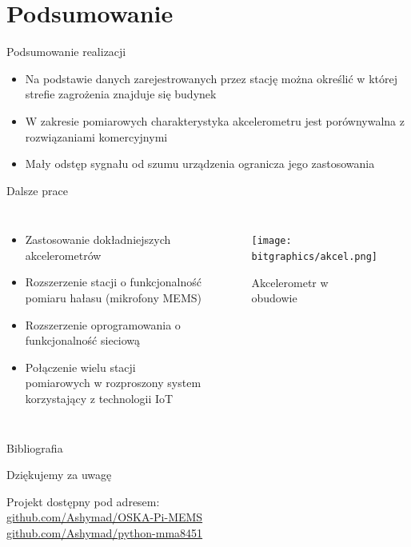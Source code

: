 \documentclass[aspectratio=1610,polish]{beamer} %
\begin{document}
  \section{Podsumowanie}
  \begin{frame}{Podsumowanie realizacji}
    \begin{itemize}
      \item Na podstawie danych zarejestrowanych przez stację można określić w której strefie zagrożenia znajduje się budynek
      \item W zakresie pomiarowych charakterystyka akcelerometru jest porównywalna z rozwiązaniami komercyjnymi
      \item Mały odstęp sygnału od szumu urządzenia ogranicza jego zastosowania
    \end{itemize}
  \end{frame}
  \begin{frame}{Dalsze prace}
    \begin{columns}
      \begin{itemize}
        \item Zastosowanie dokładniejszych akcelerometrów
        \item Rozszerzenie stacji o funkcjonalność pomiaru hałasu (mikrofony MEMS)
        \item Rozszerzenie oprogramowania o funkcjonalność sieciową
        \item Połączenie wielu stacji pomiarowych w rozproszony system korzystający z technologii IoT
      \end{itemize}
      \begin{figure}
        \texttt{[image: bitgraphics/akcel.png]}
        \caption{Akcelerometr w obudowie}
      \end{figure}
    \end{columns} 
  \end{frame}
  \begin{frame}{Bibliografia}
    \nocite{*}
    \printbibliography
  \end{frame}
  \begin{frame}
    \centering
    \vspace*{40pt}

    {\huge Dziękujemy za uwagę}
    \vspace*{20pt}

    Projekt dostępny pod adresem:\\
    \url{github.com/Ashymad/OSKA-Pi-MEMS}\\
    \url{github.com/Ashymad/python-mma8451}
  \end{frame}
\end{document}
